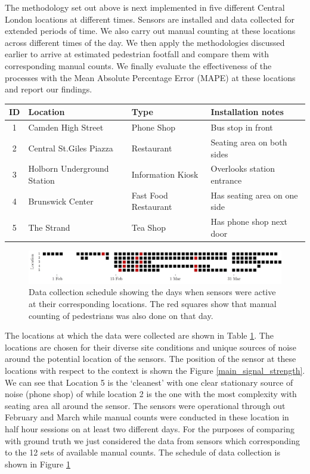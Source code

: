 The methodology set out above is next implemented in five different Central
London locations at different times. Sensors are installed and data collected
for extended periods of time. We also carry out manual counting at these
locations across different times of the day. We then apply the methodologies
discussed earlier to arrive at estimated pedestrian footfall and compare them
with corresponding manual counts.  We finally evaluate the effectiveness of the
processes with the Mean Absolute Percentage Error (MAPE) at these locations and
report our findings.

\begin{table}
	{\begin{tabular}{clll} 
		\toprule
		 ID & Location & Type & Installation notes\\
		 \midrule
		 1 & Camden High Street & Phone Shop & Bus stop in front\\
		 2 & Central St.Giles Piazza & Restaurant & Seating area on both sides\\
		 3 & Holborn Underground Station & Information Kiosk & Overlooks station entrance\\
		 4 & Brunswick Center & Fast Food Restaurant & Has seating area on one side\\
		 5 & The Strand & Tea Shop & Has phone shop next door \\
		 \bottomrule
	\end{tabular}}
	\label{locations-table}
\end{table}

\begin{figure}
	\begin{center}
		\includegraphics [width=0.90\linewidth] {images/main_schedule.jpeg}
		\caption{Data collection schedule showing the days when sensors were active at their corresponding locations. The red squares show that manual counting of pedestrians was also done on that day.}
		\label{main_schedule}
	\end{center}
\end{figure}

The locations at which the data were collected are shown in Table
\ref{locations-table}. The locations are chosen for their diverse site
conditions and unique sources of noise around the potential location of the
sensors. The position of the sensor at these locations with respect to the
context is shown the Figure \ref{main_signal_strength}. We can see that Location
5 is the `cleanest' with one clear stationary source of noise (phone shop) of
while location 2 is the one with the most complexity with seating area all
around the sensor.  The sensors were operational through out February and March
while manual counts were conducted in these location in half hour sessions on at
least two different days. For the purposes of comparing with ground truth we
just considered the data from sensors which corresponding to the 12 sets of
available manual counts. The schedule of data collection is shown in Figure
\ref{main_schedule}

